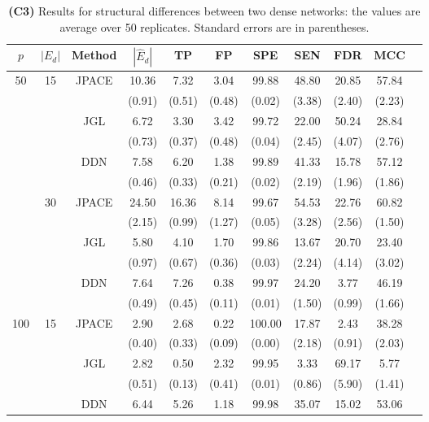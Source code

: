 \documentclass[useAMS,usenatbib,referee]{bio}
\begin{document}
{{\begin{table}[htb!]
\caption{{\bf (C3)} Results for structural differences between two dense
networks: the values are average over 50 replicates.
Standard errors are in parentheses.}
\medskip
\centering
{ %
\begin{tabular}{||c|c|c||c|c|c|c|c|c|c||c} \cline{1-10}
$p$  &  $|E_d|$  & Method & $|\hat{E}_d|$ & TP & FP & SPE & SEN & FDR & MCC \\ \hline 
\multirow{12}{*}{50}  &\multirow{6}{*}{15}  & \multirow{2}{*}{JPACE} &10.36 & 7.32 & 3.04 & 99.88 & 48.80 & 20.85 & 57.84 \\ 
& & & (0.91) & (0.51) & (0.48) & (0.02) & (3.38) & (2.40) & (2.23) \\ \cline{3-10} 
& & \multirow{2}{*}{JGL} & 6.72 & 3.30 & 3.42 & 99.72 & 22.00 & 50.24 & 28.84 \\ 
 & & & (0.73) & (0.37) & (0.48) & (0.04) & (2.45) & (4.07) & (2.76) \\ \cline{3-10} 
& & \multirow{2}{*}{DDN} & 7.58 & 6.20 & 1.38 & 99.89 & 41.33 & 15.78 & 57.12 \\ 
 & & & (0.46) & (0.33) & (0.21) & (0.02) & (2.19) & (1.96) & (1.86) \\\cline{2-10} 
  &\multirow{6}{*}{30}  & \multirow{2}{*}{JPACE} &24.50 & 16.36 & 8.14 & 99.67 & 54.53 & 22.76 & 60.82 \\ 
& & & (2.15) & (0.99) & (1.27) & (0.05) & (3.28) & (2.56) & (1.50) \\ \cline{3-10} 
& & \multirow{2}{*}{JGL} & 5.80 & 4.10 & 1.70 & 99.86 & 13.67 & 20.70 & 23.40 \\ 
 & & & (0.97) & (0.67) & (0.36) & (0.03) & (2.24) & (4.14) & (3.02) \\ \cline{3-10} 
& & \multirow{2}{*}{DDN} & 7.64 & 7.26 & 0.38 & 99.97 & 24.20 & 3.77 & 46.19 \\ 
 & & & (0.49) & (0.45) & (0.11) & (0.01) & (1.50) & (0.99) & (1.66) \\\cline{1-10} 
\multirow{12}{*}{100}  &\multirow{6}{*}{15}  & \multirow{2}{*}{JPACE} &2.90 & 2.68 & 0.22 & 100.00 & 17.87 & 2.43 & 38.28 \\ 
& & & (0.40) & (0.33) & (0.09) & (0.00) & (2.18) & (0.91) & (2.03) \\ \cline{3-10} 
& & \multirow{2}{*}{JGL} & 2.82 & 0.50 & 2.32 & 99.95 & 3.33 & 69.17 & 5.77 \\ 
 & & & (0.51) & (0.13) & (0.41) & (0.01) & (0.86) & (5.90) & (1.41) \\ \cline{3-10} 
& & \multirow{2}{*}{DDN} & 6.44 & 5.26 & 1.18 & 99.98 & 35.07 & 15.02 & 53.06 \\ 

\end{tabular}}
\end{table}}}
\end{document}
